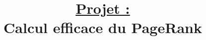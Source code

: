 \documentclass[a4paper]{article}
\title{
    \vspace{-1.5cm}
    \underline{\underline{Projet : }}\\
    Calcul efficace du PageRank
    \vspace{-2.0cm}
  }
\date{}
\author{}
\begin{document}
\maketitle

\tableofcontents
\listoffigures
\lstlistoflistings
\newpage






\end{document}
